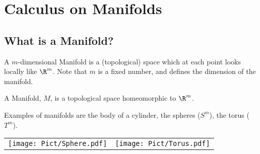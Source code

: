 



\chapter{Calculus on Manifolds}

\section{What is a Manifold?}

A $m$-dimensional {\sc Manifold} is a (topological) space which at each point looks locally like $\R^m$. Note that $m$ is a fixed number, and defines the dimension of the manifold.

\begin{Def}[Manifold]
  A {\sc Manifold}, $M$, is a topological space homeomorphic to $\R^m$.
\end{Def}



Examples of manifolds are  the body of a cylinder,  the spheres ($S^m$), the torus ($T^m$).
\begin{center}
  \begin{tabular}{cc}
    \texttt{[image: Pict/Sphere.pdf]}  & \texttt{[image: Pict/Torus.pdf]}
  \end{tabular}
\end{center}


